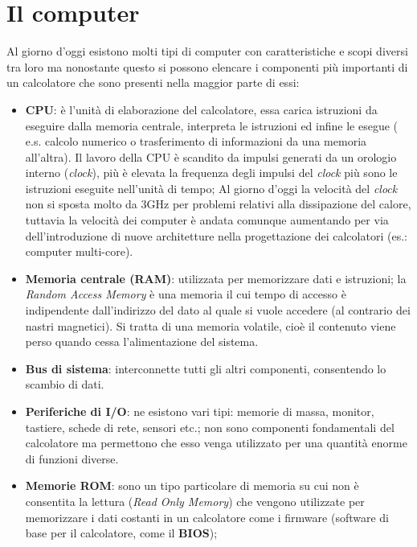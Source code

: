 \section{Il computer}
Al giorno d'oggi esistono molti tipi di computer con caratteristiche e scopi diversi tra loro ma nonostante questo si possono elencare i componenti più importanti di un calcolatore che sono presenti nella maggior parte di essi:
	\begin{itemize}
	\item\textbf{CPU}: è l’unità di elaborazione del calcolatore, essa carica istruzioni da eseguire dalla memoria centrale, interpreta le istruzioni ed infine le esegue ( e.s. calcolo numerico o trasferimento di informazioni da una memoria all’altra).
	Il lavoro della CPU è scandito da impulsi generati da un orologio interno (\textit{clock}), più è elevata la frequenza degli impulsi del \textit{clock} più sono le istruzioni eseguite nell’unità di tempo; Al giorno d'oggi la velocità del \textit{clock} non si sposta molto da 3GHz per problemi relativi alla dissipazione del calore, tuttavia la velocità dei computer è andata comunque aumentando per via dell'introduzione di nuove architetture nella progettazione dei calcolatori (es.: computer multi-core).
	\item\textbf{Memoria centrale (RAM)}: utilizzata per memorizzare dati e istruzioni; la \textit{Random Access Memory} è una memoria il cui tempo di accesso è indipendente dall’indirizzo del dato al quale si vuole accedere (al contrario dei nastri magnetici). Si tratta di una memoria volatile, cioè il contenuto viene perso quando cessa l’alimentazione del sistema.
	\item\textbf{Bus di sistema}: interconnette tutti gli altri componenti, consentendo lo scambio di dati.
	\item\textbf{Periferiche di I/O}: ne esistono vari tipi: memorie di massa, monitor, tastiere, schede di rete, sensori etc.; non sono componenti fondamentali del calcolatore  ma permettono che esso venga utilizzato per una quantità enorme di funzioni diverse.
	\item\textbf{Memorie ROM}: sono un tipo particolare di memoria su cui non è consentita la lettura (\textit{Read Only Memory}) che vengono utilizzate per memorizzare i dati costanti in un calcolatore come i firmware (software di base per il calcolatore, come il \textbf{BIOS});
\end{itemize}


